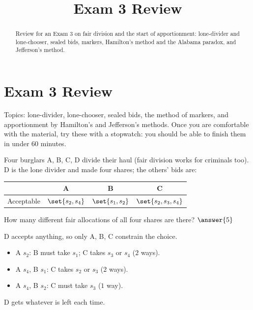 \documentclass[12pt]{ximera}
\title{Exam 3 Review}
\begin{document}
\begin{abstract}
Review for an Exam 3 on fair division and the start of apportionment: lone-divider and lone-chooser, sealed bids, markers, Hamilton's method and the Alabama paradox, and Jefferson's method.
\end{abstract}
\maketitle

\section*{Exam 3 Review}

Topics: lone-divider, lone-chooser, sealed bids, the method of markers, and
apportionment by Hamilton's and Jefferson's methods. Once you are comfortable with the
material, try these with a stopwatch: you should be able to finish them in under $60$
minutes.

\begin{problem}
Four burglars A, B, C, D divide their haul (fair division works for criminals too). D is
the lone divider and made four shares; the others' bids are:
\begin{center}
\begin{tabular}{r|ccc}
 & A & B & C\\\hline
Acceptable & $\set{s_2,s_4}$ & $\set{s_1,s_2}$ & $\set{s_2,s_3,s_4}$
\end{tabular}
\end{center}
How many different fair allocations of all four shares are there? $\answer{5}$

\begin{feedback}
D accepts anything, so only A, B, C constrain the choice.
\begin{itemize}
\item A $s_2$: B must take $s_1$; C takes $s_3$ or $s_4$ ($2$ ways).
\item A $s_4$, B $s_1$: C takes $s_2$ or $s_3$ ($2$ ways).
\item A $s_4$, B $s_2$: C must take $s_3$ ($1$ way).
\end{itemize}
D gets whatever is left each time.
\end{feedback}
\end{problem}
\end{document}
